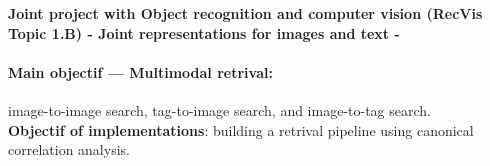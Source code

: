 \documentclass[12pt]{report}	%
\begin{document}
	 
\scribe{}

	
\maketitle


\begin{center}
\textbf{Joint project with Object recognition and computer vision (RecVis Topic 1.B) - Joint representations for images and text - }
\end{center}

\paragraph{Main objectif --- Multimodal retrival:} image-to-image search, tag-to-image search, and image-to-tag search. \\

\textbf{Objectif of implementations}: building a retrival pipeline using canonical correlation analysis.
\end{document}
